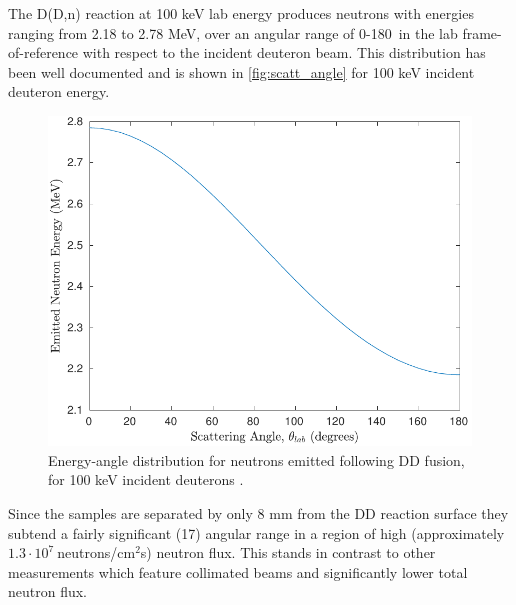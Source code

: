 \documentclass[5p]{elsarticle}
\newcommand{\sci}[2]{ #1 \cdot 10^{#2}\ }
\newcommand{\comment}[1]{\todo[color=blue!20!white,inline]{ASV: #1}}
\newcommand{\mytilde}{\raisebox{0.5ex}{\texttildelow}}
\begin{document}
The D(D,n) reaction at 100 keV lab energy produces neutrons with energies ranging from 
2.18 to 2.78 MeV, over an angular range of 0-180\degree\ in the lab frame-of-reference with respect to the incident deuteron beam.
This distribution has been well documented \cite{Liskien_Paulsen_1973} and is shown in \autoref{fig:scatt_angle} for 100 keV incident deuteron energy.






\begin{figure}
 \centering
 \includegraphics[scale=0.6]{./figures/scatt_angle.pdf}
 \caption{Energy-angle distribution for neutrons emitted following DD fusion, for 100 keV incident deuterons \cite{Liskien_Paulsen_1973}.}
 \label{fig:scatt_angle}
\end{figure}

Since the samples are separated by only  8 mm from the DD reaction surface they  subtend a fairly significant  (\mytilde 17\degree)
angular range in a region of  high  (approximately $\sci{1.3}{7}$neutrons/cm$^2$s) neutron flux.
This stands in contrast to other measurements which feature collimated beams and significantly lower total neutron flux.
 
\end{document}
